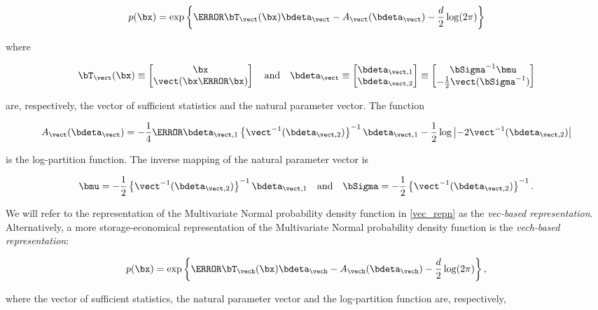\documentclass[12pt]{article}
\theoremstyle{plain}
\theoremstyle{definition}
\theoremstyle{remark}
\begin{document}
\begin{equation}
	p(\bx) = \exp \left\{ \T{\bT_{\vect} (\bx)} \bdeta_{\vect} - A_{\vect} (\bdeta_{\vect}) - \frac{d}{2} \log (2 \pi) \right\}
\label{vec_repn}
\end{equation}

\noindent where

\[
	\bT_{\vect} (\bx) \equiv \begin{bmatrix}
		\bx \\
		\vect (\bx \T{\bx})
	\end{bmatrix} \quad
	\text{and} \quad
	\bdeta_{\vect} \equiv \begin{bmatrix}
		\bdeta_{\vect, 1} \\
		\bdeta_{\vect, 2}
	\end{bmatrix} \equiv \begin{bmatrix}
		\bSigma^{-1} \bmu \\
		-\frac12 \vect (\bSigma^{-1})
	\end{bmatrix}
\]

\noindent are, respectively, the vector of sufficient statistics and the natural parameter vector. The function

\[
	A_{\vect} (\bdeta_{\vect}) =
		-\frac14 \T{\bdeta}_{\vect, 1} \left\{ \vect^{-1} (\bdeta_{\vect, 2}) \right\}^{-1} \bdeta_{\vect, 1}
		- \frac12 \log \left| -2 \vect^{-1} (\bdeta_{\vect, 2}) \right|
\]

\noindent is the log-partition function. The inverse mapping of the natural parameter vector is
\cite[equation~S.4]{wand17}

\begin{equation}
	\bmu = -\frac12 \left\{ \vect^{-1} (\bdeta_{\vect, 2}) \right\}^{-1} \bdeta_{\vect, 1} \quad
	\text{and} \quad
	\bSigma = -\frac12 \left\{ \vect^{-1} (\bdeta_{\vect, 2}) \right\}^{-1}.
\label{gauss_vec_comm_params}
\end{equation}

\noindent We will refer to the representation of the Multivariate Normal probability density function in
\eqref{vec_repn} as the \emph{vec-based representation}. Alternatively, a more storage-economical
representation of the Multivariate Normal probability density function is the \emph{vech-based representation}:

\[
	p (\bx) = \exp \left\{ \T{\bT_{\vech} (\bx)} \bdeta_{\vech} - A_{\vech} (\bdeta_{\vech}) - \frac{d}{2} \log (2 \pi) \right\},
\]

\noindent where the vector of sufficient statistics, the natural parameter vector and the log-partition function are,
respectively,
\end{document}
